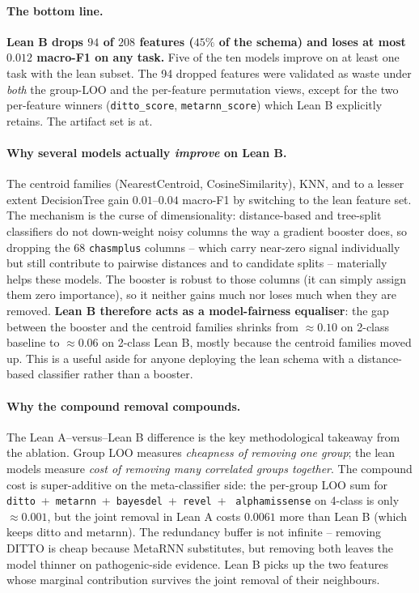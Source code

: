 \documentclass[11pt,a4paper]{article}
\begin{document}
\paragraph{The bottom line.}
\textbf{Lean B drops $94$ of $208$ features ($45\%$ of the schema) and
loses at most $0.012$ macro-F1 on any task.} Five of the ten models
improve on at least one task with the lean subset. The 94 dropped
features were validated as waste under \emph{both} the group-LOO and the
per-feature permutation views, except for the two per-feature winners
(\texttt{ditto\_score}, \texttt{metarnn\_score}) which Lean B
explicitly retains. The artifact set is at.

\paragraph{Why several models actually \emph{improve} on Lean B.}
The centroid families (NearestCentroid, CosineSimilarity), KNN, and to
a lesser extent DecisionTree gain $0.01$--$0.04$ macro-F1 by switching
to the lean feature set. The mechanism is the curse of dimensionality:
distance-based and tree-split classifiers do not down-weight noisy
columns the way a gradient booster does, so dropping the 68
\texttt{chasmplus} columns -- which carry near-zero signal individually
but still contribute to pairwise distances and to candidate splits --
materially helps these models. The booster is robust to those columns
(it can simply assign them zero importance), so it neither gains much
nor loses much when they are removed. \textbf{Lean B therefore acts as
a model-fairness equaliser}: the gap between the booster and the
centroid families shrinks from $\approx 0.10$ on 2-class baseline to
$\approx 0.06$ on 2-class Lean B, mostly because the centroid families
moved up. This is a useful aside for anyone deploying the lean schema
with a distance-based classifier rather than a booster.

\paragraph{Why the compound removal compounds.}
The Lean A--versus--Lean B difference is the key methodological
takeaway from the ablation. Group LOO measures \emph{cheapness of
removing one group}; the lean models measure \emph{cost of removing
many correlated groups together}. The compound cost is super-additive
on the meta-classifier side: the per-group LOO sum for
\texttt{ditto}~+~\texttt{metarnn}~+~\texttt{bayesdel}~+~\texttt{revel}~+~%
\texttt{alphamissense} on 4-class is only $\approx 0.001$, but the
joint removal in Lean A costs $0.0061$ more than Lean B (which keeps
ditto and metarnn). The redundancy buffer is not infinite -- removing
DITTO is cheap because MetaRNN substitutes, but removing both leaves
the model thinner on pathogenic-side evidence. Lean B picks up the two
features whose marginal contribution survives the joint removal of
their neighbours.
\end{document}
